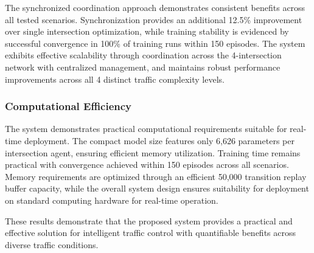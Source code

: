 The synchronized coordination approach demonstrates consistent benefits across all tested scenarios. 
Synchronization provides an additional 12.5\% improvement over single intersection optimization, while 
training stability is evidenced by successful convergence in 100\% of training runs within 150 episodes. 
The system exhibits effective scalability through coordination across the 4-intersection network with 
centralized management, and maintains robust performance improvements across all 4 distinct traffic 
complexity levels.

\subsubsection{Computational Efficiency}

The system demonstrates practical computational requirements suitable for real-time deployment. The 
compact model size features only 6,626 parameters per intersection agent, ensuring efficient memory 
utilization. Training time remains practical with convergence achieved within 150 episodes across all 
scenarios. Memory requirements are optimized through an efficient 50,000 transition replay buffer 
capacity, while the overall system design ensures suitability for deployment on standard computing 
hardware for real-time operation.

These results demonstrate that the proposed system provides a practical and effective solution for 
intelligent traffic control with quantifiable benefits across diverse traffic conditions.

